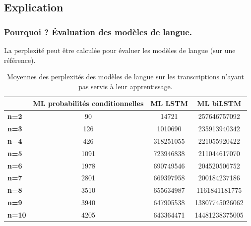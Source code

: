 \documentclass{beamer}
\begin{document}
		\subsection{Explication}
		\begin{frame}\frametitle{Pourquoi ? \'{E}valuation des modèles de langue.}
		La perplexité peut être calculée pour évaluer les modèles de langue (sur une référence).
		\begin{scriptsize}
		
		\begin{table}[h]
	    \begin{center}
	    \begin{tabular}{|l|c|c|c|}
	    \hline
	                  & \textbf{ML probabilités conditionnelles} & \multicolumn{1}{r|}{\textbf{ML LSTM}} & \textbf{ML biLSTM} \\ \hline
	    \textbf{n=2}  & 90                                       & 14721                                 & 257646757092       \\ \hline
	    \textbf{n=3}  & 126                                      & 1010690                               & 235913940342       \\ \hline
	    \textbf{n=4}  & 426                                      & 318251055                             & 221055920422       \\ \hline
	    \textbf{n=5}  & 1091                                     & 723946838                             & 211044617070       \\ \hline
	    \textbf{n=6}  & 1978                                     & 690749546                             & 204520506752       \\ \hline
	    \textbf{n=7}  & 2801                                     & 669397958                             & 200184237186       \\ \hline
	    \textbf{n=8}  & 3510                                     & 655634987                             & 1161841181775      \\ \hline
	    \textbf{n=9}  & 3940                                     & 647905538                             & 13807745026062     \\ \hline
	    \textbf{n=10} & 4205                                     & 643364471                             & 14481238375005     \\ \hline
	    \end{tabular}\caption{Moyennes des perplexités des modèles de langue sur les transcriptions n'ayant pas servis à leur apprentissage.}\label{tab:perplex}
	    \end{center}
	    \end{table}
	    \end{scriptsize}
		\end{frame}
\end{document}
